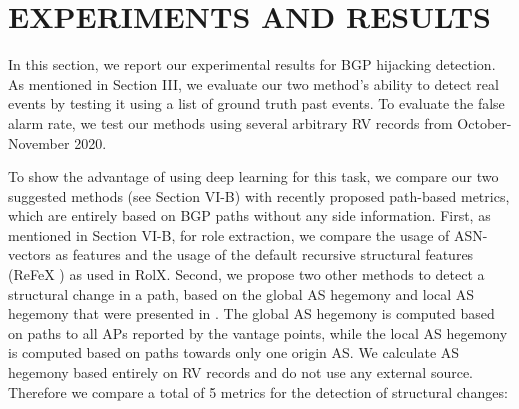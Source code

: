 \documentclass[10pt,journal]{IEEEtran}
\begin{document}
\section{EXPERIMENTS AND RESULTS}
In this section, we report our experimental results for BGP hijacking detection. As mentioned in Section III, we evaluate our two method's ability to detect real events by testing it using a list of ground truth past events. To evaluate the false alarm rate, we test our methods using several arbitrary RV records from October-November 2020.

To show the advantage of using deep learning for this task, we compare our two suggested methods (see Section VI-B) with recently proposed path-based metrics, which are entirely based on BGP paths without any side information. First, as mentioned in Section VI-B, for role extraction, we compare the usage of ASN-vectors as features and the usage of the default recursive structural features (ReFeX \cite{henderson2011its}) as used in RolX. Second, we propose two other methods to detect a structural change in a path, based on the global AS hegemony \cite{fontugne2018thin} and local AS hegemony that were presented in \cite{cho2019bgp}. The global AS hegemony is computed based on paths to all APs reported by the vantage points, while the local AS hegemony is computed based on paths towards only one origin AS. We calculate AS hegemony based entirely on RV records and do not use any external source. Therefore we compare a total of 5 metrics for the detection of structural changes:
\end{document}
